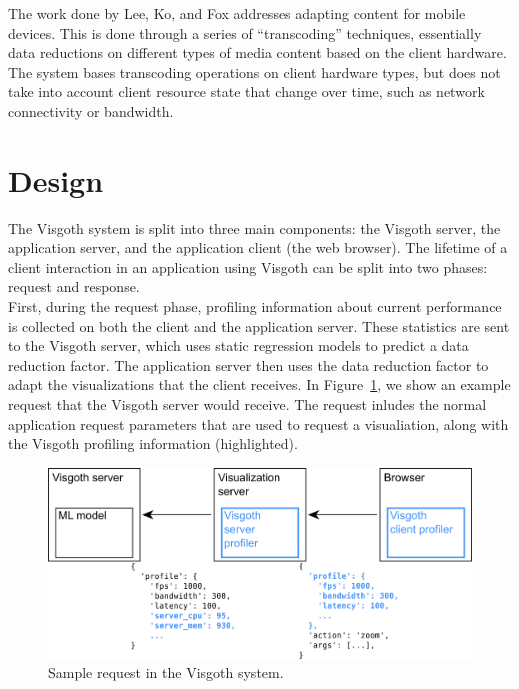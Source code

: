 The work done by Lee, Ko, and Fox \cite{adapting-heterogeneous} addresses
adapting content for mobile devices.  This is done through a series of
``transcoding'' techniques, essentially data reductions on different types of
media content based on the client hardware.  The system bases transcoding
operations on client hardware types, but does not take into account client
resource state that change over time, such as network connectivity or
bandwidth.\\

\section{Design}\label{visgoth-ch:design}

The Visgoth system is split into three main components: the Visgoth server, the
application server, and the application client (the web browser). The lifetime
of a client interaction in an application using Visgoth can be split into two
phases: request and response. \\

First, during the request phase, profiling information about current
performance is collected on both the client and the application server. These
statistics are sent to the Visgoth server, which uses static regression models
to predict a data reduction factor. The application server then uses the data
reduction factor to adapt the visualizations that the client receives. In
Figure~\ref{fig:system-request}, we show an example request that the Visgoth
server would receive. The request inludes the normal application request
parameters that are used to request a visualiation, along with the Visgoth
profiling information (highlighted).\\

\begin{figure}[h]
\begin{center}
\includegraphics[scale=0.4]{./img/system-request.png}
\caption{Sample request in the Visgoth system.}
\label{fig:system-request}
\end{center}
\end{figure}

